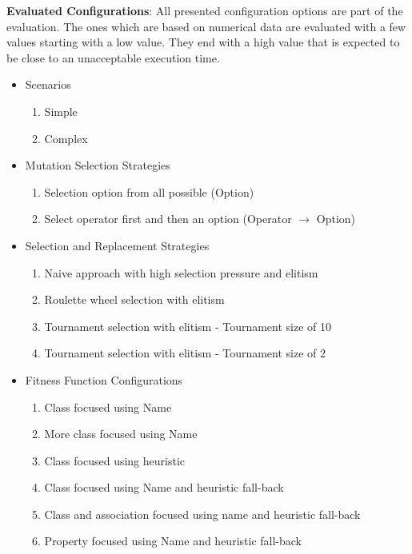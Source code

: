 \textbf{Evaluated Configurations}: All presented configuration options are part of the evaluation. The ones which are based on numerical data are evaluated with a few values starting with a low value. They end with a high value that is expected to be close to an unacceptable execution time.
\begin{itemize}
\item Scenarios
	\begin{enumerate}
	\item Simple
	\item Complex
	\end{enumerate}

\item Mutation Selection Strategies
	\begin{enumerate}
	\item Selection option from all possible (Option)
	\item Select operator first and then an option (Operator $\rightarrow$ Option)
	\end{enumerate}
	
\item Selection and Replacement Strategies
	\begin{enumerate}
	\item Naive approach with high selection pressure and elitism
	\item Roulette wheel selection with elitism
	\item Tournament selection with elitism - Tournament size of 10
	\item Tournament selection with elitism - Tournament size of 2
	\end{enumerate}
	
\item Fitness Function Configurations
	\begin{enumerate}
	\item Class focused using Name
	\item More class focused using Name
	\item Class focused using heuristic
	\item Class focused using Name and heuristic fall-back
	\item Class and association focused using name and heuristic fall-back
	\item Property focused using Name and heuristic fall-back
	\end{enumerate}	
	

\end{itemize}
